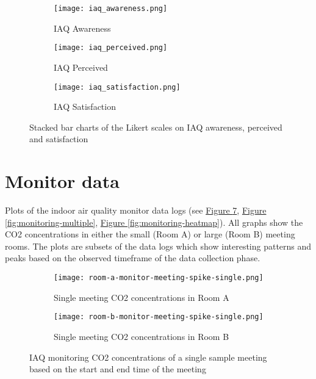 \begin{appendices}
\begin{figure}[htbp]
    \centering
    \begin{subfigure}{0.18\textwidth}
        \centering
        \texttt{[image: iaq\_awareness.png]}
        \caption{IAQ Awareness}
        \label{fig:survey-awareness}
    \end{subfigure}
    \hfill
    \begin{subfigure}{0.18\textwidth}
        \centering
        \texttt{[image: iaq\_perceived.png]}
        \caption{IAQ Perceived}
        \label{fig:survey-perceived}
    \end{subfigure}
    \hfill
    \begin{subfigure}{0.18\textwidth}
        \centering
        \texttt{[image: iaq\_satisfaction.png]}
        \caption{IAQ Satisfaction}
        \label{fig:survey-satisfaction}
    \end{subfigure}    
    \caption{Stacked bar charts of the Likert scales on IAQ awareness, perceived and satisfaction}
    \label{fig:survey-stacked-bars}
\end{figure}

\newpage

\section{Monitor data}
\label{appendix:monitor-data}

Plots of the indoor air quality monitor data logs (see \hyperref[fig:monitoring-single]{Figure \ref{fig:monitoring-single}}, \hyperref[fig:monitoring-multiple]{Figure \ref{fig:monitoring-multiple}}, \hyperref[fig:monitoring-heatmap]{Figure \ref{fig:monitoring-heatmap}}). All graphs show the CO2 concentrations in either the small (Room A) or large (Room B) meeting rooms. The plots are subsets of the data logs which show interesting patterns and peaks based on the observed timeframe of the data collection phase.

\begin{figure}[htbp]
    \centering
    \begin{subfigure}{0.46\textwidth}
        \centering
        \texttt{[image: room-a-monitor-meeting-spike-single.png]}
        \caption{Single meeting CO2 concentrations in Room A}
        \label{fig:monitor-single-a}
    \end{subfigure}
    \hfill
    \begin{subfigure}{0.46\textwidth}
        \centering
        \texttt{[image: room-b-monitor-meeting-spike-single.png]}
        \caption{Single meeting CO2 concentrations in Room B}
        \label{fig:monitor-single-b}
    \end{subfigure}
    \caption{IAQ monitoring CO2 concentrations of a single sample meeting based on the start and end time of the meeting}
    \label{fig:monitoring-single}
\end{figure}


\end{appendices}

